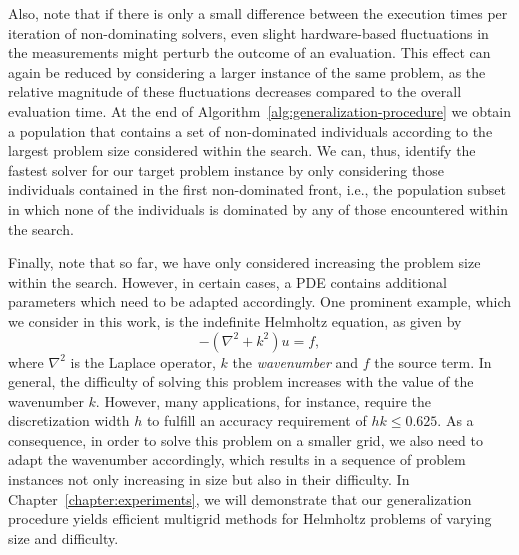Also, note that if there is only a small difference between the execution times per iteration of non-dominating solvers, even slight hardware-based fluctuations in the measurements might perturb the outcome of an evaluation.
This effect can again be reduced by considering a larger instance of the same problem, as the relative magnitude of these fluctuations decreases compared to the overall evaluation time.
At the end of Algorithm~\ref{alg:generalization-procedure} we obtain a population that contains a set of non-dominated individuals according to the largest problem size considered within the search.
We can, thus, identify the fastest solver for our target problem instance by only considering those individuals contained in the first non-dominated front, i.e., the population subset in which none of the individuals is dominated by any of those encountered within the search.

Finally, note that so far, we have only considered increasing the problem size within the search.
However, in certain cases, a PDE contains additional parameters which need to be adapted accordingly.
One prominent example, which we consider in this work, is the indefinite Helmholtz equation, as given by
\begin{equation}
	-(\nabla^{2} + k^{2})u = f,
	\label{eq:helmholtz}
\end{equation}
where $\nabla^{2}$ is the Laplace operator, $k$ the \emph{wavenumber} and $f$ the source term.
In general, the difficulty of solving this problem increases with the value of the wavenumber $k$.
However, many applications, for instance, require the discretization width $h$ to fulfill an accuracy requirement of $h k \leq 0.625$. 
As a consequence, in order to solve this problem on a smaller grid, we also need to adapt the wavenumber accordingly, which results in a sequence of problem instances not only increasing in size but also in their difficulty.
In Chapter~\ref{chapter:experiments}, we will demonstrate that our generalization procedure yields efficient multigrid methods for Helmholtz problems of varying size and difficulty.

